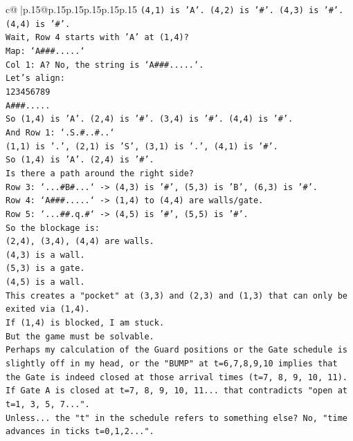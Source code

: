 \documentclass{article}
\begin{document}
{\begin{supertabular}{c@{$\;$}|p{.15\linewidth}@{}p{.15\linewidth}p{.15\linewidth}p{.15\linewidth}p{.15\linewidth}p{.15\linewidth}}
{{{\texttt{(4,1) is 'A'. (4,2) is '\#'. (4,3) is '\#'. (4,4) is '\#'.} \\
\texttt{Wait, Row 4 starts with 'A' at (1,4)?} \\
\texttt{Map: `A\#\#\#.....`} \\
\texttt{Col 1: A? No, the string is `A\#\#\#.....`.} \\
\texttt{Let's align:} \\
\texttt{123456789} \\
\texttt{A\#\#\#.....} \\
\texttt{So (1,4) is 'A'. (2,4) is '\#'. (3,4) is '\#'. (4,4) is '\#'.} \\
\texttt{And Row 1: `.S.\#..\#..`} \\
\texttt{(1,1) is '.', (2,1) is 'S', (3,1) is '.', (4,1) is '\#'.} \\
\texttt{So (1,4) is 'A'. (2,4) is '\#'.} \\
\texttt{Is there a path around the right side?} \\
\texttt{Row 3: `...\#B\#...` {-}> (4,3) is '\#', (5,3) is 'B', (6,3) is '\#'.} \\
\texttt{Row 4: `A\#\#\#.....` {-}> (1,4) to (4,4) are walls/gate.} \\
\texttt{Row 5: `...\#\#.q.\#` {-}> (4,5) is '\#', (5,5) is '\#'.} \\
\texttt{So the blockage is:} \\
\texttt{(2,4), (3,4), (4,4) are walls.} \\
\texttt{(4,3) is a wall.} \\
\texttt{(5,3) is a gate.} \\
\texttt{(4,5) is a wall.} \\
\texttt{This creates a "pocket" at (3,3) and (2,3) and (1,3) that can only be exited via (1,4).} \\
\texttt{If (1,4) is blocked, I am stuck.} \\
\texttt{But the game must be solvable.} \\
\texttt{Perhaps my calculation of the Guard positions or the Gate schedule is slightly off in my head, or the "BUMP" at t=6,7,8,9,10 implies that the Gate is indeed closed at those arrival times (t=7, 8, 9, 10, 11).} \\
\texttt{If Gate A is closed at t=7, 8, 9, 10, 11... that contradicts "open at t=1, 3, 5, 7...".} \\
\texttt{Unless... the "t" in the schedule refers to something else? No, "time advances in ticks t=0,1,2...".} \\
}}}
\end{supertabular}}
\end{document}
